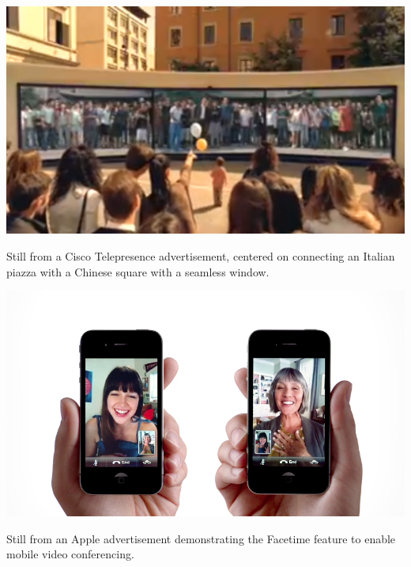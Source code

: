 \begin{marginfigure}
	\includegraphics{figures/cisco-telepresence.png}
	\caption{Still from a Cisco Telepresence advertisement, centered on connecting an Italian piazza with a Chinese square with a seamless window.}
	\label{fig:cisco-telepresence}
\end{marginfigure}



\begin{marginfigure}
	\includegraphics{figures/iphone-face-to-face.png}
	\caption{Still from an Apple advertisement demonstrating the Facetime feature to enable mobile video conferencing.}
	\label{fig:facetime}
\end{marginfigure}




